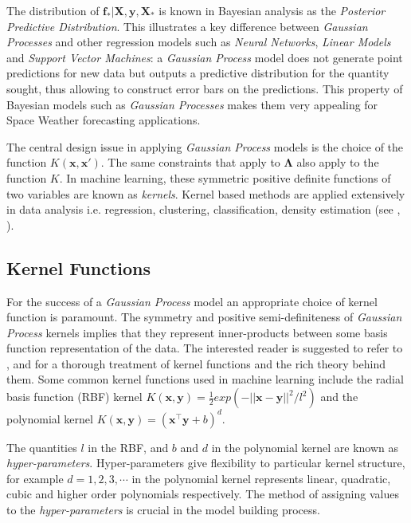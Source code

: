 \documentclass[referee,a4paper,12pt,traditabstract]{swsc}
\begin{document}
\begin{linenumbers}
The distribution of $\mathbf{f_*}| \mathbf{X},\mathbf{y},\mathbf{X_*}$ is known in Bayesian analysis as the \emph{Posterior Predictive Distribution}. This illustrates a key difference between \emph{Gaussian Processes} and other regression models such as \emph{Neural Networks}, \emph{Linear Models} and \emph{Support Vector Machines}: a \emph{Gaussian Process} model does not generate point predictions for new data but outputs a predictive distribution for the quantity sought, thus allowing to construct error bars on the predictions. This property of Bayesian models such as \emph{Gaussian Processes} makes them very appealing for Space Weather forecasting applications. 

The central design issue in applying \emph{Gaussian Process} models is the choice of the function $K(\mathbf{x}, \mathbf{x}')$. The same constraints that apply to $\mathbf{\Lambda}$ also apply to the function $K$. In machine learning, these symmetric positive definite functions of two variables are known as \emph{kernels}. Kernel based methods are applied extensively in data analysis i.e. regression, clustering, classification, density estimation (see \citet{Scholkopf:2001:LKS:559923}, \citet{hofmann2008}).

\subsection{Kernel Functions}

For the success of a \emph{Gaussian Process} model an appropriate choice of kernel function is paramount. The symmetry and positive semi-definiteness of \emph{Gaussian Process} kernels implies that they represent inner-products between some basis function representation of the data. The interested reader is suggested to refer to \cite{Berlinet2004}, \citet{Scholkopf:2001:LKS:559923} and \citet{hofmann2008} for a thorough treatment of kernel functions and the rich theory behind them. Some common kernel functions used in machine learning include the radial basis function (RBF) kernel $K(\mathbf{x}, \mathbf{y}) = \frac{1}{2} exp(-||\mathbf{x} - \mathbf{y}||^2/l^2)$ and the polynomial kernel $K(\mathbf{x}, \mathbf{y}) = (\mathbf{x}^\intercal \mathbf{y} + b)^d$. 

The quantities $l$ in the RBF, and $b$ and $d$ in the polynomial kernel are known as \emph{hyper-parameters}. Hyper-parameters give flexibility to particular kernel structure, for example $d = 1, 2, 3, \cdots$ in the polynomial kernel represents linear, quadratic, cubic and higher order polynomials respectively. The method of assigning values to the \emph{hyper-parameters} is crucial in the model building process. 


\end{linenumbers}
\end{document}
